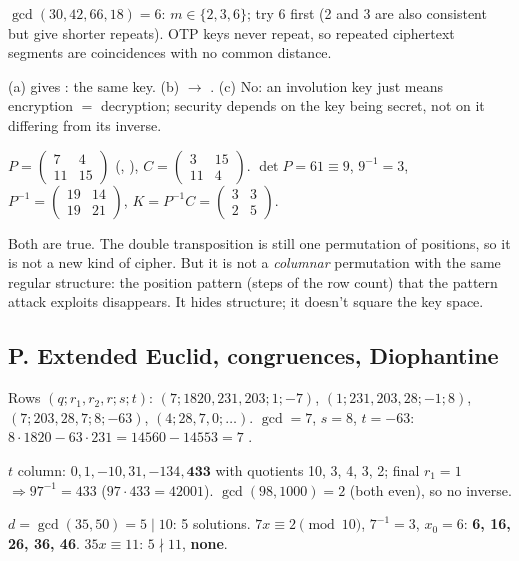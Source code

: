 \ans $\gcd(30, 42, 66, 18) = 6$: $m \in \{2, 3, 6\}$; try 6 first (2 and 3 are also consistent but give shorter repeats). OTP keys never repeat, so repeated ciphertext segments are coincidences with no common distance.

\ans (a)  gives : the same key. (b)  $\to$ . (c) No: an involution key just means encryption $=$ decryption; security depends on the key being secret, not on it differing from its inverse.

\ans $P = \begin{pmatrix}7&4\\11&15\end{pmatrix}$ (, ), $C = \begin{pmatrix}3&15\\11&4\end{pmatrix}$. $\det P = 61 \equiv 9$, $9^{-1} = 3$, $P^{-1} = \begin{pmatrix}19&14\\19&21\end{pmatrix}$, $K = P^{-1}C = \begin{pmatrix}3&3\\2&5\end{pmatrix}$.

\ans Both are true. The double transposition is still one permutation of positions, so it is not a new kind of cipher. But it is not a \emph{columnar} permutation with the same regular structure: the position pattern (steps of the row count) that the pattern attack exploits disappears. It hides structure; it doesn't square the key space.

\subsection*{P. Extended Euclid, congruences, Diophantine}
\ans Rows $(q; r_1, r_2, r; s; t)$: $(7; 1820, 231, 203; 1; -7)$, $(1; 231, 203, 28; -1; 8)$, $(7; 203, 28, 7; 8; -63)$, $(4; 28, 7, 0; \dots)$. $\gcd = 7$, $s = 8$, $t = -63$: $8 \cdot 1820 - 63 \cdot 231 = 14560 - 14553 = 7$ \checkmark.

\ans $t$ column: $0, 1, -10, 31, -134, \mathbf{433}$ with quotients 10, 3, 4, 3, 2; final $r_1 = 1$ $\Rightarrow 97^{-1} = 433$ ($97 \cdot 433 = 42001$). $\gcd(98, 1000) = 2$ (both even), so no inverse.

\ans $d = \gcd(35, 50) = 5 \mid 10$: 5 solutions. $7x \equiv 2 \pmod{10}$, $7^{-1} = 3$, $x_0 = 6$: \textbf{6, 16, 26, 36, 46}. $35x \equiv 11$: $5 \nmid 11$, \textbf{none}.

